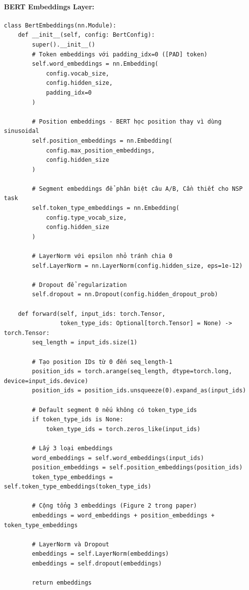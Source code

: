 \paragraph{BERT Embeddings Layer:}
\begin{verbatim}
class BertEmbeddings(nn.Module):
    def __init__(self, config: BertConfig):
        super().__init__()
        # Token embeddings với padding_idx=0 ([PAD] token)
        self.word_embeddings = nn.Embedding(
            config.vocab_size, 
            config.hidden_size, 
            padding_idx=0
        )
        
        # Position embeddings - BERT học position thay vì dùng sinusoidal
        self.position_embeddings = nn.Embedding(
            config.max_position_embeddings, 
            config.hidden_size
        )
        
        # Segment embeddings để phân biệt câu A/B, Cần thiết cho NSP task
        self.token_type_embeddings = nn.Embedding(
            config.type_vocab_size, 
            config.hidden_size
        )
        
        # LayerNorm với epsilon nhỏ tránh chia 0
        self.LayerNorm = nn.LayerNorm(config.hidden_size, eps=1e-12)
        
        # Dropout để regularization
        self.dropout = nn.Dropout(config.hidden_dropout_prob)

    def forward(self, input_ids: torch.Tensor, 
                token_type_ids: Optional[torch.Tensor] = None) -> torch.Tensor:
        seq_length = input_ids.size(1)
        
        # Tạo position IDs từ 0 đến seq_length-1
        position_ids = torch.arange(seq_length, dtype=torch.long, device=input_ids.device)
        position_ids = position_ids.unsqueeze(0).expand_as(input_ids)

        # Default segment 0 nếu không có token_type_ids
        if token_type_ids is None:
            token_type_ids = torch.zeros_like(input_ids)

        # Lấy 3 loại embeddings
        word_embeddings = self.word_embeddings(input_ids)
        position_embeddings = self.position_embeddings(position_ids)
        token_type_embeddings = self.token_type_embeddings(token_type_ids)

        # Cộng tổng 3 embeddings (Figure 2 trong paper)
        embeddings = word_embeddings + position_embeddings + token_type_embeddings

        # LayerNorm và Dropout
        embeddings = self.LayerNorm(embeddings)
        embeddings = self.dropout(embeddings)
        
        return embeddings
\end{verbatim}

